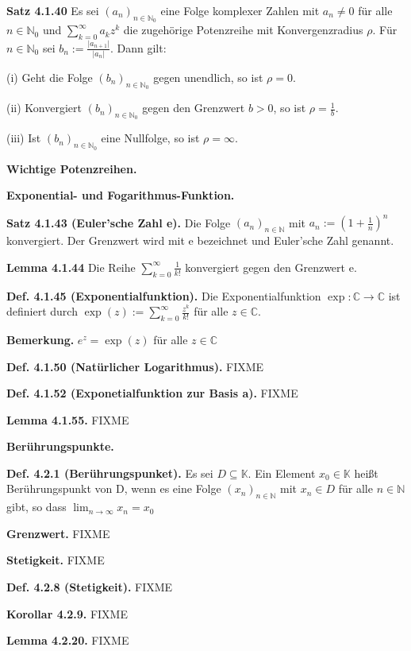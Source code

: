 \documentclass[ngerman]{article}
\begin{document}
\begin{multicols}{4}
\begin{tiny}
\textbf{Satz 4.1.40} Es sei $(a_n)_{n \in \mathbb N_0}$ eine Folge komplexer Zahlen mit $a_n \neq 0$ für alle $n \in \mathbb N_0$ und $\sum_{k=0}^\infty a_k z^k$ die zugehörige Potenzreihe mit Konvergenzradius $\rho$. Für $n \in \mathbb N_0$ sei $b_n := \frac{\vert a_{n+1} \vert }{\vert a_n \vert}$. Dann gilt:

(i) Geht die Folge $(b_n)_{n \in \mathbb N_0}$ gegen unendlich, so ist $\rho = 0$.

(ii) Konvergiert $(b_n)_{n \in \mathbb N_0}$ gegen den Grenzwert $b > 0$, so ist $\rho = \frac{1}{b}$.

(iii) Ist $(b_n)_{n \in \mathbb N_0}$ eine Nullfolge, so ist $\rho = \infty$.

\textbf{Wichtige Potenzreihen.}

\textbf{Exponential- und Fogarithmus-Funktion.}

\textbf{Satz 4.1.43 (Euler’sche Zahl e).} Die Folge $(a_n)_{n \in \mathbb N}$ mit $a_n := (1+\frac{1}{n})^n$ konvergiert. Der Grenzwert wird mit e bezeichnet und Euler’sche Zahl genannt.

\textbf{Lemma 4.1.44} Die Reihe $\sum_{k=0}^\infty \frac{1}{k!}$ konvergiert gegen den Grenzwert e.

\textbf{Def. 4.1.45 (Exponentialfunktion).} Die Exponentialfunktion $\exp : \mathbb C \rightarrow \mathbb C$ ist definiert durch $\exp (z) :=  \sum_{k=0}^\infty \frac{z^k}{k!}$ für alle $z \in \mathbb C$.

\textbf{Bemerkung.} $e^z = \exp (z)$ für alle $z \in \mathbb C$

\textbf{Def. 4.1.50 (Natürlicher Logarithmus).} FIXME

\textbf{Def. 4.1.52 (Exponetialfunktion zur Basis a).} FIXME

\textbf{Lemma 4.1.55.} FIXME

\textbf{Berührungspunkte.}

\textbf{Def. 4.2.1 (Berührungspunket).} Es sei $D \subseteq \mathbb K$. Ein Element $x_0 \in \mathbb K$ heißt Berührungspunkt von D, wenn es eine Folge $(x_n)_{n \in \mathbb N}$ mit $x_n \in D$ für alle $n \in \mathbb N$ gibt, so dass $\lim_{n \rightarrow \infty} x_n = x_0$

\textbf{Grenzwert.} FIXME

\textbf{Stetigkeit.} FIXME

\textbf{Def. 4.2.8 (Stetigkeit).} FIXME

\textbf{Korollar 4.2.9.} FIXME

\textbf{Lemma 4.2.20.} FIXME


\end{tiny}
\end{multicols}
\end{document}
